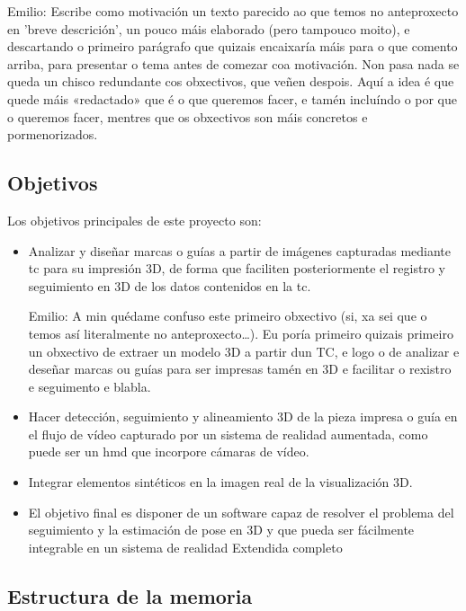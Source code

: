{\color{red} Emilio:}
{\color{gray} Escribe como motivación un texto parecido ao que temos
  no anteproxecto en 'breve descrición', un pouco máis elaborado (pero
  tampouco moito), e descartando o primeiro parágrafo que quizais
  encaixaría máis para o que comento arriba, para presentar o tema
  antes de comezar coa motivación. Non pasa nada se queda un chisco
  redundante cos obxectivos, que veñen despois. Aquí a idea é que
  quede máis «redactado» que é o que queremos facer, e tamén incluíndo
  o por que o queremos facer, mentres que os obxectivos son máis
  concretos e pormenorizados.
}

\subsection{Objetivos}
Los objetivos principales de este proyecto son:
\begin{itemize}
    \item Analizar y diseñar marcas o guías a partir de imágenes capturadas mediante \acrfull{tc} para su impresión 3D, de forma que faciliten posteriormente el registro y seguimiento en 3D de los datos contenidos en la \acrshort{tc}.

{\color{red} Emilio:}
{\color{gray} A min quédame confuso este primeiro obxectivo (si, xa
  sei que o temos así literalmente no anteproxecto\ldots).  Eu poría
  primeiro quizais primeiro un obxectivo de extraer un modelo 3D a
  partir dun TC, e logo o de analizar e deseñar marcas ou guías para
  ser impresas tamén en 3D e facilitar o rexistro e seguimento e
  blabla.
}

    \item Hacer detección, seguimiento y alineamiento 3D de la pieza impresa o guía en el flujo de vídeo capturado por un sistema de realidad aumentada, como puede ser un \acrshort{hmd} que incorpore cámaras de vídeo.
    \item Integrar elementos sintéticos en la imagen real de la visualización 3D.
    \item El objetivo final es disponer de un software capaz de resolver el problema del seguimiento y la estimación de pose en 3D y que pueda ser fácilmente integrable en un sistema de realidad Extendida completo
\end{itemize}

\subsection{Estructura de la memoria}

